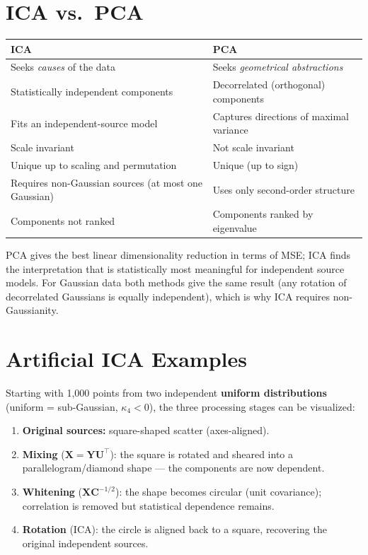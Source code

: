 \documentclass[11pt, oneside]{book}
\newcommand{\T}{^{\top}}
\begin{document}
\section{ICA vs.\ PCA}

\begin{center}
\renewcommand{\arraystretch}{1.25}
\begin{tabular}{ll}
  \toprule
  \textbf{ICA} & \textbf{PCA} \\
  \midrule
  Seeks \emph{causes} of the data & Seeks \emph{geometrical abstractions} \\
  Statistically independent components & Decorrelated (orthogonal) components \\
  Fits an independent-source model & Captures directions of maximal variance \\
  Scale invariant & Not scale invariant \\
  Unique up to scaling and permutation & Unique (up to sign) \\
  Requires non-Gaussian sources (at most one Gaussian) & Uses only second-order structure \\
  Components not ranked & Components ranked by eigenvalue \\
  \bottomrule
\end{tabular}
\end{center}

\begin{intbox}
  PCA gives the best linear dimensionality reduction in terms of MSE; ICA finds the
  interpretation that is statistically most meaningful for independent source models.
  For Gaussian data both methods give the same result (any rotation of decorrelated
  Gaussians is equally independent), which is why ICA requires non-Gaussianity.
\end{intbox}


\section{Artificial ICA Examples}

Starting with 1{,}000 points from two independent \textbf{uniform distributions}
(uniform = sub-Gaussian, $\kappa_4 < 0$), the three processing stages can be visualized:

\begin{enumerate}
  \item \textbf{Original sources:} square-shaped scatter (axes-aligned).
  \item \textbf{Mixing} ($\bm{X} = \bm{Y}\bm{U}\T$): the square is rotated and sheared
        into a parallelogram/diamond shape --- the components are now dependent.
  \item \textbf{Whitening} ($\bm{X}\bm{C}^{-1/2}$): the shape becomes circular
        (unit covariance); correlation is removed but statistical dependence remains.
  \item \textbf{Rotation} (ICA): the circle is aligned back to a square, recovering
        the original independent sources.
\end{enumerate}
\end{document}
